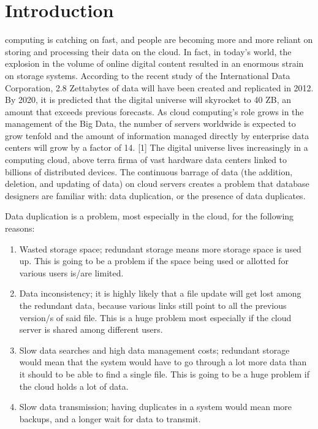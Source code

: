 \documentclass[journal]{IEEEtran}
\begin{document}
\section{Introduction}
% 
% 
% 
% 
 computing is catching on fast, and people are becoming more and more reliant on storing and processing their data on the cloud. In fact, in today’s world, the explosion in the volume of online digital content resulted in an enormous strain on storage systems. According to the recent study of the International Data Corporation, 2.8 Zettabytes of data will have been created and replicated in 2012. By 2020, it is predicted that the digital universe will skyrocket to 40 ZB, an amount that exceeds previous forecasts. As cloud computing’s role grows in the management of the Big Data, the number of servers worldwide is expected to grow tenfold and the amount of information managed directly by enterprise data centers will grow by a factor of 14. [1] The digital universe lives increasingly in a computing cloud, above terra firma of vast hardware data centers linked to billions of distributed devices. The continuous barrage of data (the addition, deletion, and updating of data) on cloud servers creates a problem that database designers are familiar with: data duplication, or the presence of data duplicates.

Data duplication is a problem, most especially in the cloud, for the following reasons:

\begin{enumerate}
	\item Wasted storage space; redundant storage means more storage space is used up. This is going to be a problem if the space being used or allotted for various users is/are limited.

	\item Data inconsistency; it is highly likely that a file update will get lost among the redundant data, because various links still point to all the previous version/s of said file. This is a huge problem most especially if the cloud server is shared among different users.

	\item Slow data searches and high data management costs; redundant storage would mean that the system would have to go through a lot more data than it should to be able to find a single file. This is going to be a huge problem if the cloud holds a lot of data. 

	\item Slow data transmission; having duplicates in a system would mean more backups, and a longer wait for data to transmit.
\end{enumerate}
\end{document}
